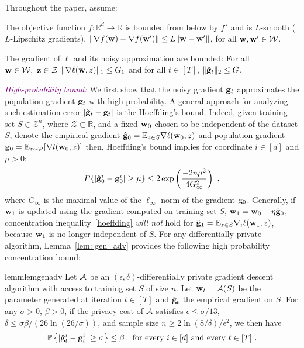 \documentclass[11pt]{article}
\begin{document}
Throughout the paper, assume:
\begin{assumption}
The objective function $ f: \mathbb{R}^d \rightarrow \mathbb{R}$ is bounded from below by $f^\star$ and is $L$-smooth ($L$-Lipschitz gradients), \ie$\nonumber \|\nabla f(\mathbf{w}) -\nabla f(\mathbf{w}^\prime) \|\leq L \|\mathbf{w}-\mathbf{w}^\prime \|$, for all $\w, \w^\prime \in \cW$.
\end{assumption}
\begin{assumption}
The gradient of $\ell$ and its noisy approximation are bounded: For all $\w \in \cW, \  \z \in \cZ$ $\|\nabla \ell (\mathbf{w}, z) \|_1 \leq G_1$ and for all $t \in [T]$, $\|\tilde {\mathbf{g}}_t\|_2 \leq G$.
\end{assumption}


\textcolor{purple}{\textit{High-probability bound:}}
We first show that the noisy gradient $\tilde {\mathbf{g}}_t$ approximates the population gradient $\mathbf{g}_t$ with high probability.
A general approach for analyzing such estimation error $| \tilde {\mathbf{g}}_t - \mathbf{g}_t|$ is the Hoeffding's bound. 
Indeed, given training set $S \in \mathcal{Z}^n$, where $\mathcal{Z} \subset \mathbb{R}$, and a fixed $\mathbf{w}_0$ chosen to be independent of the dataset $S$, denote the empirical gradient $\hat {\mathbf{g}}_0= \mathbb{E}_{z \in S}\nabla \ell(\mathbf{w}_0,z)$ and population gradient $\mathbf{g}_0 = \mathbb{E}_{z\sim \mathcal{P}}[\nabla l(\mathbf{w}_0,z)]$ then, Hoeffding's bound implies for coordinate $i \in [d]$ and $\mu > 0$:
\begin{equation} \label{hoeffding}
P\{|\hat {\mathbf{g}}^i_0 - \mathbf{g}_0^i | \geq \mu \} \leq2 \exp \left(\frac{-2n\mu^2}{4G_\infty^2} \right)~,
\end{equation}
 where $G_\infty$ is the maximal value of the $\ell_\infty$-norm of the gradient $ \mathbf{g}_0$. 
Generally, if $\mathbf{w}_1$ is updated using the gradient computed on training set $S$, \ie $\mathbf{w}_1 = \mathbf{w}_0 - \eta \hat {\mathbf{g}}_0$, concentration inequality~\ref{hoeffding} \emph{will not} hold for $\hat {\mathbf{g}}_1 = \mathbb{E}_{z \in S}\nabla_i \ell(\mathbf{w}_1,z)$, because $\mathbf{w}_1$ is no longer independent of $S$. 
For any differentially private algorithm, Lemma~\ref{lem: gen_adv} provides the following high probability concentration bound:  
\begin{restatable}{lemm}{lemgenadv}
\label{lem: gen_adv}
	Let $\cA$ be an $(\epsilon, \delta)$-differentially private gradient descent algorithm with access to training set $S$ of size $n$. Let $\w_t = \cA(S)$ be the parameter generated at iteration $t \in [T]$ and $\hat {\mathbf{g}}_t$ the empirical gradient on $S$. For any $\sigma >0$, $\beta > 0$, if the privacy cost of $\cA$ satisfies $\epsilon \leq \sigma/13$, $\delta \leq \sigma \beta/(26 \ln(26/\sigma))$, and sample size $n \geq 2\ln(8/\delta)/\epsilon^2$, we then have
	\begin{equation*}
	\mathbb{P}\left\{ |\hat {\mathbf{g}}_t^i - \mathbf{g}_t^i| \geq  \sigma \right\} \leq \beta \quad \textrm{for every $ i\in [d]$ and every $t \in [T]$} ~.
	\end{equation*} 
\end{restatable}
\end{document}

